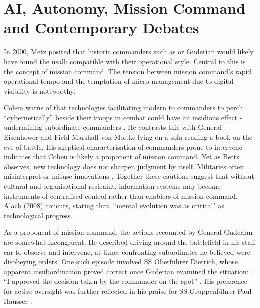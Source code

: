 \section{AI, Autonomy, Mission Command and Contemporary Debates} 
In 2000, Metz  posited that historic commanders such as  or Guderian would likely have found the \gls{usalb} compatible with their operational style\nocite{METZ_2000}. Central to this is the concept of mission command. The tension between mission command's rapid operational tempo and the temptation of micro-management due to digital visibility is noteworthy.

Cohen warns of that technologies facilitating modern to commanders to perch ``cybernetically'' beside their troops in combat could have an insidious effect - undermining subordinate commanders \parencite{COHEN_1996}. He contrasts this with General Eisenhower and Field Marshall von Moltke lying on a sofa reading a book on the eve of battle. His skeptical characterisation of commanders prone to intervene indicates that Cohen is likely a proponent of mission command. Yet as Betts observes, new technology does not sharpen judgment by itself. Militaries often misinterpret or misuse innovations \parencite{BETTS_1996}. Together these cautions suggest that without cultural and organisational restraint, information systems may become instruments of centralised control rather than enablers of mission command. Alach (2008) concurs, stating that, ``mental evolution was as critical" as technological progress\nocite{ALACH_2008}.

As a proponent of mission command, the actions recounted by General Guderian are somewhat incongruent. He described driving around the battlefield in his staff car to observe and intervene, at times confronting subordinates he believed were disobeying orders. One such episode involved SS Oberf\"uhrer  Dietrich, whose apparent insubordination proved correct once Guderian examined the situation: ``I approved the decision taken by the commander on the spot'' \parencite[p.~117]{GUDERIAN_1952}. His preference for active oversight was further reflected in his praise for SS Gruppenf\"uhrer Paul Hausser \parencite[p.~73]{YEIDE_2011}. %


